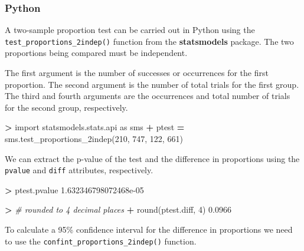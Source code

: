 \documentclass[
]{book}
\newenvironment{Shaded}{\begin{snugshade}}{\end{snugshade}}
\newcommand{\BuiltInTok}[1]{#1}
\newcommand{\CommentTok}[1]{\textcolor[rgb]{0.56,0.35,0.01}{\textit{#1}}}
\newcommand{\DecValTok}[1]{\textcolor[rgb]{0.00,0.00,0.81}{#1}}
\newcommand{\FloatTok}[1]{\textcolor[rgb]{0.00,0.00,0.81}{#1}}
\newcommand{\ImportTok}[1]{#1}
\newcommand{\NormalTok}[1]{#1}
\newcommand{\OperatorTok}[1]{\textcolor[rgb]{0.81,0.36,0.00}{\textbf{#1}}}
\begin{document}
\hypertarget{python-48}{%
\subsubsection*{Python}\label{python-48}}

A two-sample proportion test can be carried out in Python using the \texttt{test\_proportions\_2indep()} function from the \textbf{statsmodels} package. The two proportions being compared must be independent.

The first argument is the number of successes or occurrences for the first proportion. The second argument is the number of total trials for the first group. The third and fourth arguments are the occurrences and total number of trials for the second group, respectively.

\begin{Shaded}
\begin{Highlighting}[]
\OperatorTok{\textgreater{}} \ImportTok{import}\NormalTok{ statsmodels.stats.api }\ImportTok{as}\NormalTok{ sms}
\OperatorTok{+}\NormalTok{ ptest }\OperatorTok{=}\NormalTok{ sms.test\_proportions\_2indep(}\DecValTok{210}\NormalTok{, }\DecValTok{747}\NormalTok{, }\DecValTok{122}\NormalTok{, }\DecValTok{661}\NormalTok{)}
\end{Highlighting}
\end{Shaded}

We can extract the p-value of the test and the difference in proportions using the \texttt{pvalue} and \texttt{diff} attributes, respectively.

\begin{Shaded}
\begin{Highlighting}[]
\OperatorTok{\textgreater{}}\NormalTok{ ptest.pvalue}
\FloatTok{1.632346798072468e{-}05}
\end{Highlighting}
\end{Shaded}

\begin{Shaded}
\begin{Highlighting}[]
\OperatorTok{\textgreater{}} \CommentTok{\# rounded to 4 decimal places}
\OperatorTok{+} \BuiltInTok{round}\NormalTok{(ptest.diff, }\DecValTok{4}\NormalTok{)}
\FloatTok{0.0966}
\end{Highlighting}
\end{Shaded}

To calculate a 95\% confidence interval for the difference in proportions we need to use the \texttt{confint\_proportions\_2indep()} function.
\end{document}
